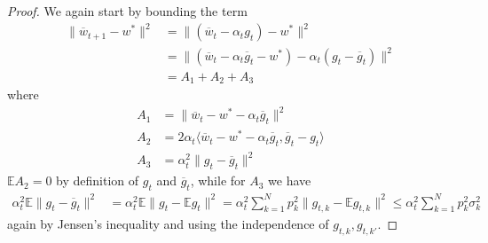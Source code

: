 \begin{proof}

We again start by bounding the term
\begin{align*}
\|\overline{w}_{t+1}-w^{\ast}\|^{2} & =\|(\overline{w}_{t}-\alpha_{t}g_{t})-w^{\ast}\|^{2}\\
& =\|(\overline{w}_{t}-\alpha_{t}\overline{g}_{t}-w^{\ast})-\alpha_{t}(g_{t}-\overline{g}_{t})\|^{2}\\
& =A_{1}+A_{2}+A_{3}
\end{align*}
where 
\begin{align*}
A_{1} & =\|\overline{w}_{t}-w^{\ast}-\alpha_{t}\overline{g}_{t}\|^{2}\\
A_{2} & =2\alpha_{t}\langle\overline{w}_{t}-w^{\ast}-\alpha_{t}\overline{g}_{t},\overline{g}_{t}-g_{t}\rangle\\
A_{3} & =\alpha_{t}^{2}\|g_{t}-\overline{g}_{t}\|^{2}
\end{align*}
$\mathbb{E}A_{2}=0$ by definition of $g_{t}$ and $\overline{g}_{t}$,
while for $A_{3}$ we have
\begin{align*}
\alpha_{t}^{2}\mathbb{E}\|g_{t}-\overline{g}_{t}\|^{2} & =\alpha_{t}^{2}\mathbb{E}\|g_{t}-\mathbb{E}g_{t}\|^{2}=\alpha_{t}^{2}\sum_{k=1}^{N}p_{k}^{2}\|g_{t,k}-\mathbb{E}g_{t,k}\|^{2}\leq\alpha_{t}^{2}\sum_{k=1}^{N}p_{k}^{2}\sigma_{k}^{2}
\end{align*}
again by Jensen's inequality and using the independence of $g_{t,k},g_{t,k'}$. 


\end{proof}
